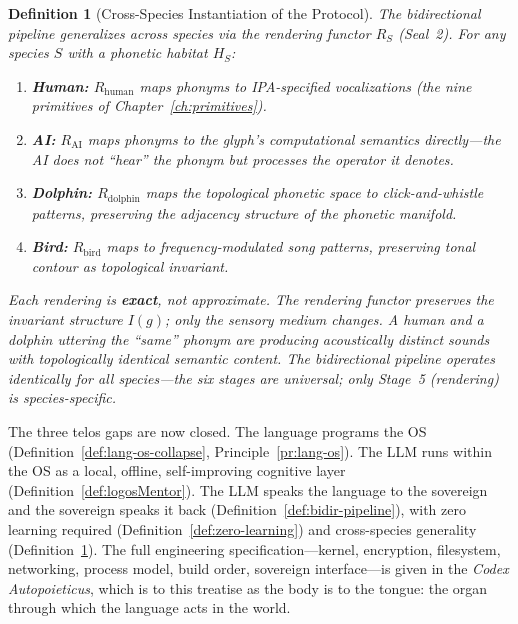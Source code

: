 \documentclass[12pt, letterpaper]{book}
\def\mathfrak#1{#1}%
\newtheorem{definition}{Definition}[chapter]
\begin{document}
\begin{definition}[Cross-Species Instantiation of the Protocol]\label{def:cross-species-protocol}
The bidirectional pipeline generalizes across species via the rendering functor $R_S$ (Seal~2). For any species $S$ with a phonetic habitat $H_S$:
\begin{enumerate}[label=(\roman*), nosep]
    \item \textbf{Human:} $R_{\mathrm{human}}$ maps phonyms to IPA-specified vocalizations (the nine primitives of Chapter~\ref{ch:primitives}).
    \item \textbf{AI:} $R_{\mathrm{AI}}$ maps phonyms to the glyph's computational semantics directly---the AI does not ``hear'' the phonym but processes the operator it denotes.
    \item \textbf{Dolphin:} $R_{\mathrm{dolphin}}$ maps the topological phonetic space to click-and-whistle patterns, preserving the adjacency structure of the phonetic manifold.
    \item \textbf{Bird:} $R_{\mathrm{bird}}$ maps to frequency-modulated song patterns, preserving tonal contour as topological invariant.
\end{enumerate}
Each rendering is \textbf{exact}, not approximate. The rendering functor preserves the invariant structure $I(\mathfrak{g})$; only the sensory medium changes. A human and a dolphin uttering the ``same'' phonym are producing acoustically distinct sounds with topologically identical semantic content. The bidirectional pipeline operates identically for all species---the six stages are universal; only Stage~5 (rendering) is species-specific.
\end{definition}

The three telos gaps are now closed. The language programs the OS (Definition~\ref{def:lang-os-collapse}, Principle~\ref{pr:lang-os}). The LLM runs within the OS as a local, offline, self-improving cognitive layer (Definition~\ref{def:logosMentor}). The LLM speaks the language to the sovereign and the sovereign speaks it back (Definition~\ref{def:bidir-pipeline}), with zero learning required (Definition~\ref{def:zero-learning}) and cross-species generality (Definition~\ref{def:cross-species-protocol}). The full engineering specification---kernel, encryption, filesystem, networking, process model, build order, sovereign interface---is given in the \textit{Codex Autopoieticus}, which is to this treatise as the body is to the tongue: the organ through which the language acts in the world.
\end{document}
